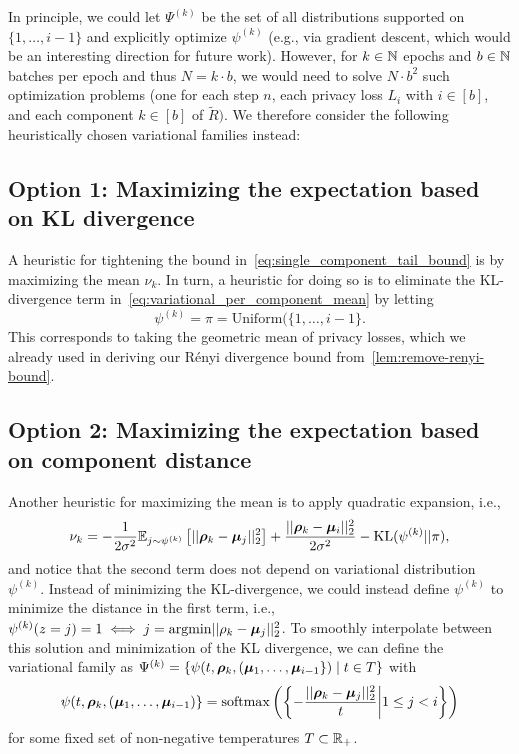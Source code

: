 In principle, we could let $\Psi^{(k)}$ be the set of all distributions supported on $\{1,\dots, i-1\}$ and explicitly optimize $\psi^{(k)}$ (e.g., via gradient descent, which would be an interesting direction for future work).
However, for $k \in {\mathbb{N}}$ epochs and $b \in {\mathbb{N}}$ batches per epoch and thus $N = k \cdot b$, we would need to solve
$N \cdot b^2$ such optimization problems (one for each step $n$, each privacy loss $L_i$ with $i \in [b]$, and  each component $k \in [b]$ of $\tilde{R})$. 
We therefore consider the following heuristically chosen variational families instead:

\subsection{Option 1: Maximizing the expectation based on KL divergence}
A heuristic for tightening the bound in~\cref{eq:single_component_tail_bound}
is by maximizing the mean $\nu_k$.
In turn, a heuristic for doing so is to eliminate the  KL-divergence term in~\cref{eq:variational_per_component_mean}
by letting
\begin{equation*}
    \psi^{(k)} = \pi = \mathrm{Uniform}(\{1,\dots, i-1\}.
\end{equation*}
This corresponds to taking the geometric mean of privacy losses, which we already used in deriving our R\'enyi divergence bound from~\cref{lem:remove-renyi-bound}.

\subsection{Option 2: Maximizing the expectation based on component distance}
Another heuristic for maximizing the mean is to apply quadratic expansion, i.e., 
\begin{equation*}
    \nu_k = - \frac{1}{2 \sigma^2} \mathbb{E}_{j \sim \psi^{(k)}}\left[||{\bm{\rho}}_k - {\bm{\mu}}_j||_2^2\right]
    + \frac{||{\bm{\rho}}_k - {\bm{\mu}}_i||_2^2}{2\sigma^2} - \mathrm{KL}(\psi^{(k)} || \pi),
\end{equation*}
and notice that the second term does not depend on variational distribution $\psi^{(k)}$.
Instead of minimizing the KL-divergence, we could instead define $\psi^{(k)}$ to minimize the distance in the first term, i.e., $\psi^{(k)}(z=j) = 1 \iff j = \mathrm{argmin} ||\rho_k - {\bm{\mu}}_j||_2^2$.
To smoothly interpolate between this solution and minimization of the KL divergence, we can define
the variational family as
$\Psi^{(k)} = \{\psi(t, {\bm{\rho}}_k, ({\bm{\mu}}_1,\dots,{\bm{\mu}}_{i-1}\}) \mid t \in T\}$ with
\begin{equation*}
    \psi(t, {\bm{\rho}}_k, ({\bm{\mu}}_1,\dots,{\bm{\mu}}_{i-1})\}
    = \mathrm{softmax}\left( \left\{- \frac{||{\bm{\rho}}_k - {\bm{\mu}}_j||_2^2}{t } \middle| 1 \leq j < i\right\} \right)
\end{equation*}
for some fixed set of non-negative temperatures $T \subset {\mathbb{R}}_+$.

